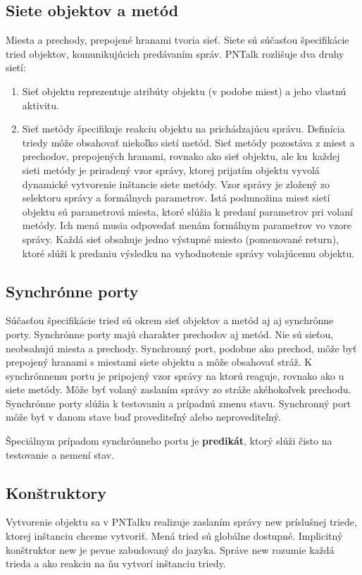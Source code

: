 \subsection{Siete objektov a metód}
Miesta a prechody, prepojené hranami tvoria sieť. Siete sú súčasťou špecifikácie tried objektov, komunikujúcich predávaním správ. PNTalk rozlišuje dva druhy sietí:

\begin{enumerate}
	\item Sieť objektu reprezentuje atribúty objektu (v podobe miest) a jeho vlastnú aktivitu.
	
	\item Sieť metódy špecifikuje reakciu objektu na prichádzajúcu správu. Definícia triedy môže obsahovať niekoľko sietí metód. Sieť metódy pozostáva z miest a prechodov, prepojených hranami, rovnako ako sieť objektu, ale ku každej sieti metódy je priradený vzor správy, ktorej prijatím objektu vyvolá dynamické vytvorenie inštancie siete metódy. Vzor správy je zložený zo selektoru správy a formálnych parametrov. Istá podmnožina miest sietí objektu sú parametrová miesta, ktoré slúžia k predaní parametrov pri volaní metódy. Ich mená musia odpovedať menám formálnym parametrov vo vzore správy. Každá sieť obsahuje jedno výstupné miesto (pomenované return), ktoré slúži k predaniu výsledku na vyhodnotenie správy volajúcemu objektu.
\end{enumerate}

\subsection{Synchrónne porty}
Súčasťou špecifikácie tried sú okrem sieť objektov a metód aj aj synchrónne porty. Synchrónne porty majú charakter prechodov aj metód. Nie sú sieťou, neobsahujú miesta a prechody. Synchronný port, podobne ako prechod, môže byť prepojený hranami s miestami siete objektu a môže obsahovať stráž. K synchrónnemu portu je pripojený vzor správy na ktorú reaguje, rovnako ako u siete metódy. Môže byť volaný zaslaním správy zo stráže akéhokoľvek prechodu. Synchrónne porty slúžia k testovaniu a prípadnú zmenu stavu. Synchronný port môže byť v danom stave buď provediteľný alebo neprovediteľný.

Špeciálnym prípadom synchrónneho portu je \textbf{predikát}, ktorý slúži čisto na testovanie a nemení stav.

\subsection{Konštruktory}
Vytvorenie objektu sa v PNTalku realizuje zaslaním správy new príslušnej triede, ktorej inštanciu chceme vytvoriť. Mená tried sú globálne dostupné. Implicitný konštruktor new je pevne zabudovaný do jazyka. Správe new rozumie každá trieda a ako reakciu na ňu vytvorí inštanciu triedy.

